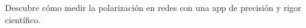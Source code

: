 \documentclass[preview]{standalone}
\begin{document}
\begin{center}
Descubre cómo medir la polarización en redes con una app de precisión y rigor científico.
\end{center}
\end{document}
